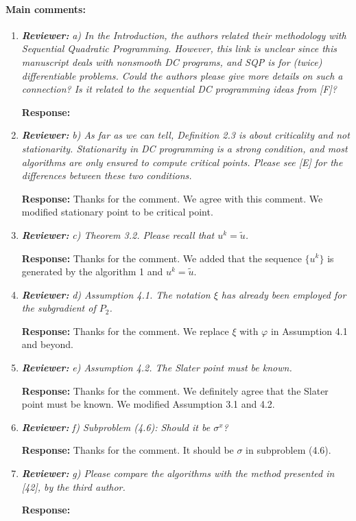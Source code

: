 \documentclass{article}
\begin{document}
\paragraph{Main comments:}
\begin{enumerate}
	\item \textit{\textbf{Reviewer:}} \textit{ a) In the Introduction, the authors related their methodology with Sequential Quadratic Programming. However, this link is unclear since this manuscript deals with nonsmooth DC programs, and SQP is for (twice) differentiable problems. Could the authors please give more details on such a connection? Is it related to the sequential DC programming ideas from [F]?}
	
	\textbf{Response:} {\color{red}{Unanswered.}}
	
	\item \textit{\textbf{Reviewer:}} \textit{ b) As far as we can tell, Definition 2.3 is about criticality and not stationarity. Stationarity in DC programming is a strong condition, and most algorithms are only ensured to compute critical points. Please see [E] for the differences between these two conditions.}
	
	\textbf{Response:} Thanks for the comment. We agree with this comment. We modified stationary point to be critical point.
	
	\item  \textit{\textbf{Reviewer:}} \textit{ c) Theorem 3.2. Please recall that $u^k = \tilde u$.}
	
	\textbf{Response:} Thanks for the comment. We added that the sequence $\{u^k\}$ is generated by the algorithm 1 and $u^k = \tilde u$.

	\item \textit{\textbf{Reviewer:}} \textit{ d) Assumption 4.1. The notation $\xi$ has already been employed for the subgradient of $P_2$.}

    \textbf{Response:} Thanks for the comment. We replace $\xi$ with $\varphi$ in Assumption 4.1 and beyond.

	\item \textit{\textbf{Reviewer:}} \textit{ e) Assumption 4.2. The Slater point must be known.}

    \textbf{Response:} Thanks for the comment. We definitely agree that the Slater point must be known. We modified Assumption 3.1 and 4.2.

	\item \textit{\textbf{Reviewer:}} \textit{ f) Subproblem (4.6): Should it be $\sigma^x$?}

    \textbf{Response:} Thanks for the comment. It should be $\sigma$ in subproblem (4.6).

	\item \textit{\textbf{Reviewer:}} \textit{ g) Please compare the algorithms with the method presented in [42], by the third author.}

    \textbf{Response:} {\color{red}{Unanswered.}}
\end{enumerate}
\end{document}
